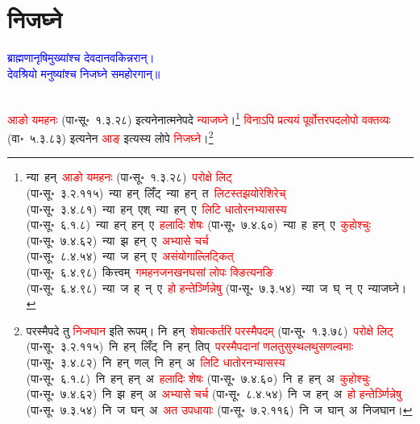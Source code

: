 \section[निजघ्ने]{निजघ्ने}
\centering\textcolor{blue}{ब्राह्मणानृषिमुख्यांश्च देवदानवकिन्नरान्।\nopagebreak\\
देवश्रियो मनुष्यांश्च निजघ्ने समहोरगान्॥}\nopagebreak\\
\\
\fontsize{14}{21}\selectfont\begin{sloppypar}\justifying\noindent\hspace{10mm} \textcolor{red}{आङो यमहनः} (पा॰सू॰~१.३.२८) इत्यनेनात्मनेपदे \textcolor{red}{न्याजघ्ने}।\footnote{न्या~हन्~\arrow \textcolor{red}{आङो यमहनः} (पा॰सू॰~१.३.२८)~\arrow \textcolor{red}{परोक्षे लिट्} (पा॰सू॰~३.२.११५)~\arrow न्या~हन्~लिँट्~\arrow न्या~हन्~त~\arrow \textcolor{red}{लिटस्तझयोरेशिरेच्} (पा॰सू॰~३.४.८१)~\arrow न्या~हन्~एश्~\arrow न्या~हन्~ए~\arrow \textcolor{red}{लिटि धातोरनभ्यासस्य} (पा॰सू॰~६.१.८)~\arrow न्या~हन्~हन्~ए~\arrow \textcolor{red}{हलादिः शेषः} (पा॰सू॰~७.४.६०)~\arrow न्या~ह~हन्~ए~\arrow \textcolor{red}{कुहोश्चुः} (पा॰सू॰~७.४.६२)~\arrow न्या~झ~हन्~ए~\arrow \textcolor{red}{अभ्यासे चर्च} (पा॰सू॰~८.४.५४)~\arrow न्या~ज~हन्~ए~\arrow \textcolor{red}{असंयोगाल्लिट्कित्} (पा॰सू॰~६.४.९८)~\arrow कित्त्वम्~\arrow \textcolor{red}{गम\-हन\-जन\-खन\-घसां लोपः क्ङित्यनङि} (पा॰सू॰~६.४.९८)~\arrow न्या~ज~ह्~न्~ए~\arrow \textcolor{red}{हो हन्तेर्ञ्णिन्नेषु} (पा॰सू॰~७.३.५४)~\arrow न्या~ज~घ्~न्~ए~\arrow न्याजघ्ने।} \textcolor{red}{विनाऽपि प्रत्ययं पूर्वोत्तर\-पद\-लोपो वक्तव्यः} (वा॰~५.३.८३) इत्यनेन \textcolor{red}{आङ्} इत्यस्य लोपे \textcolor{red}{निजघ्ने}।\footnote{परस्मैपदे तु \textcolor{red}{निजघान} इति रूपम्। नि~हन्~\arrow \textcolor{red}{शेषात्कर्तरि परस्मैपदम्} (पा॰सू॰~१.३.७८)~\arrow \textcolor{red}{परोक्षे लिट्} (पा॰सू॰~३.२.११५)~\arrow नि~हन्~लिँट्~\arrow नि~हन्~तिप्~\arrow \textcolor{red}{परस्मैपदानां णलतुसुस्थलथुस\-णल्वमाः} (पा॰सू॰~३.४.८२)~\arrow नि~हन्~णल्~\arrow नि~हन्~अ~\arrow \textcolor{red}{लिटि धातोरनभ्यासस्य} (पा॰सू॰~६.१.८)~\arrow नि~हन्~हन्~अ~\arrow \textcolor{red}{हलादिः शेषः} (पा॰सू॰~७.४.६०)~\arrow नि~ह~हन्~अ~\arrow \textcolor{red}{कुहोश्चुः} (पा॰सू॰~७.४.६२)~\arrow नि~झ~हन्~अ~\arrow \textcolor{red}{अभ्यासे चर्च} (पा॰सू॰~८.४.५४)~\arrow नि~ज~हन्~अ~\arrow \textcolor{red}{हो हन्तेर्ञ्णिन्नेषु} (पा॰सू॰~७.३.५४)~\arrow नि~ज~घन्~अ~\arrow \textcolor{red}{अत उपधायाः} (पा॰सू॰~७.२.११६)~\arrow नि~ज~घान्~अ~\arrow निजघान।}\end{sloppypar}
